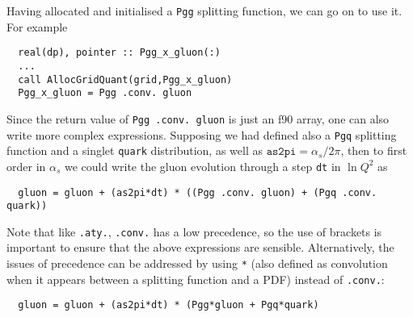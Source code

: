 \documentclass[12pt]{article}
\newcommand{\as}{\alpha_s}
\begin{document}
Having allocated and initialised a \texttt{Pgg} splitting function, we
can go on to use it. For example 
\begin{verbatim}
  real(dp), pointer :: Pgg_x_gluon(:)
  ...
  call AllocGridQuant(grid,Pgg_x_gluon)
  Pgg_x_gluon = Pgg .conv. gluon
\end{verbatim}  
Since the return value of \texttt{Pgg .conv.\ gluon} is just an f90
array, one can also write more complex expressions. Supposing we had
defined also a \texttt{Pgq} splitting function and a singlet
\texttt{quark} distribution, as well as $\texttt{as2pi} = \as/2\pi$,
then to first order in $\as$ we could write the gluon evolution
through a step \texttt{dt} in $\ln Q^2$ as
\begin{verbatim}
  gluon = gluon + (as2pi*dt) * ((Pgg .conv. gluon) + (Pgq .conv. quark))
\end{verbatim}
Note that like \texttt{.aty.}, \texttt{.conv.} has a low precedence,
so the use of brackets is important to ensure that the above
expressions are sensible. Alternatively, the issues of precedence can
be addressed by using \texttt{*} (also defined as convolution when it
appears between a splitting function and a PDF) instead of
\texttt{.conv.}:
\begin{verbatim}
  gluon = gluon + (as2pi*dt) * (Pgg*gluon + Pgq*quark)
\end{verbatim}


\end{document}
